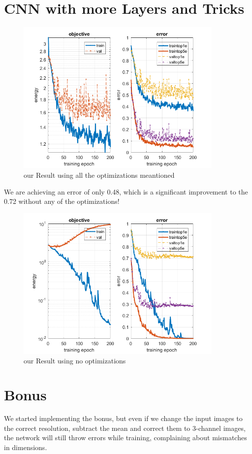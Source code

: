 \documentclass[12pt]{article}
\begin{document}
\newpage
\section{CNN with more Layers and Tricks}

        \begin{figure}[H]
            \centering
                \includegraphics[width=0.9\textwidth]{Plots/q4_plot_epo_200.png}
                \caption{our Result using all the optimizations meantioned}
        \end{figure}
        We are achieving an error of only 0.48, which is a significant improvement to the 0.72 without any of the optimizations!
        \begin{figure}[H]
            \centering
                \includegraphics[width=0.9\textwidth]{Plots/init_plot_epo_200.png}
                \caption{our Result using no optimizations}
        \end{figure}

\section{Bonus}
We started implementing the bonus, but even if we change the input images to the correct resolution, subtract the mean and correct them to 3-channel images, the network will still throw errors while training, complaining about mismatches in dimensions.
\end{document}
